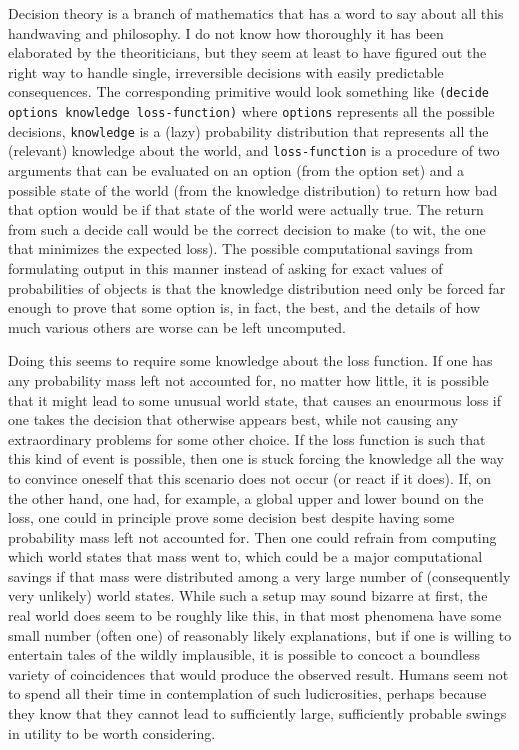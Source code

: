 \documentclass[12pt]{article}
\newcommand{\code}[1]{\texttt{#1}}
\begin{document}
Decision theory is a branch of mathematics that has a word to say
about all this handwaving and philosophy.  I do not know how
thoroughly it has been elaborated by the theoriticians, but they seem
at least to have figured out the right way to handle single,
irreversible decisions with easily predictable consequences.  The
corresponding primitive would look something like \code{(decide
options knowledge loss-function)} where \code{options} represents all
the possible decisions, \code{knowledge} is a (lazy) probability
distribution that represents all the (relevant) knowledge about the
world, and \code{loss-function} is a procedure of two arguments that
can be evaluated on an option (from the option set) and a possible
state of the world (from the knowledge distribution) to return how bad
that option would be if that state of the world were actually true.
The return from such a decide call would be the correct decision to
make (to wit, the one that minimizes the expected loss).  The possible
computational savings from formulating output in this manner instead
of asking for exact values of probabilities of objects is that the
knowledge distribution need only be forced far enough to prove that
some option is, in fact, the best, and the details of how much various
others are worse can be left uncomputed.

Doing this seems to require some knowledge about the loss function.
If one has any probability mass left not accounted for, no matter how
little, it is possible that it might lead to some unusual world state,
that causes an enourmous loss if one takes the decision that otherwise
appears best, while not causing any extraordinary problems for some
other choice.  If the loss function is such that this kind of event is
possible, then one is stuck forcing the knowledge all the way to
convince oneself that this scenario does not occur (or react if it
does).  If, on the other hand, one had, for example, a global upper
and lower bound on the loss, one could in principle prove some
decision best despite having some probability mass left not accounted
for.  Then one could refrain from computing which world states that
mass went to, which could be a major computational savings if that
mass were distributed among a very large number of (consequently very
unlikely) world states.  While such a setup may sound bizarre at
first, the real world does seem to be roughly like this, in that most
phenomena have some small number (often one) of reasonably likely
explanations, but if one is willing to entertain tales of the wildly
implausible, it is possible to concoct a boundless variety of
coincidences that would produce the observed result.  Humans seem not
to spend all their time in contemplation of such ludicrosities,
perhaps because they know that they cannot lead to sufficiently large,
sufficiently probable swings in utility to be worth considering.
\end{document}
